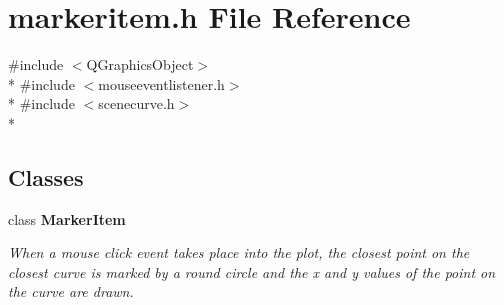 \section{markeritem.\+h File Reference}
\label{items_2markeritem_8h}
{\ttfamily \#include $<$Q\+Graphics\+Object$>$}\\*
{\ttfamily \#include $<$mouseeventlistener.\+h$>$}\\*
{\ttfamily \#include $<$scenecurve.\+h$>$}\\*
\subsection*{Classes}
\begin{DoxyCompactItemize}
\item 
class {\bf Marker\+Item}
\begin{DoxyCompactList}\small\item\em When a mouse click event takes place into the plot, the closest point on the closest curve is marked by a round circle and the x and y values of the point on the curve are drawn. \end{DoxyCompactList}\end{DoxyCompactItemize}
